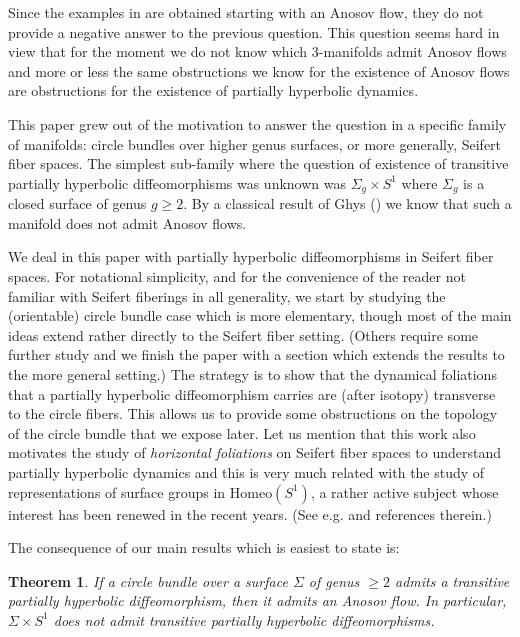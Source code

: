 \documentclass[11pt]{amsart} %
\numberwithin{equation}{section}
\newtheorem*{teo*}{Theorem}
\theoremstyle{remark}
\begin{document}
Since the examples in \cite{BPP,BGP,BGHP} are obtained starting with an Anosov flow, they do not provide a negative answer to the previous question. This question seems hard in view that for the moment we do not know which 3-manifolds admit Anosov flows and more or less the same obstructions we know for the existence of Anosov flows are obstructions for the existence of partially hyperbolic dynamics. 

This paper grew out of the motivation to answer the question in a specific family of manifolds: circle bundles over higher genus surfaces, or more generally, Seifert fiber spaces. The simplest sub-family where the question of existence of transitive partially hyperbolic diffeomorphisms was unknown was $\Sigma_g \times S^1$ where $\Sigma_g$ is a closed surface of genus $g \geq 2$. By a classical result of Ghys (\cite{Ghys}) we know that such a manifold does not admit Anosov flows. %

We deal in this paper with partially hyperbolic diffeomorphisms in Seifert fiber spaces. For notational  simplicity, and for the convenience of the reader not familiar with Seifert fiberings in all generality, we start by studying the (orientable) circle bundle case which is more elementary, though most of the main ideas extend rather directly to the Seifert fiber setting. (Others require some further study and we finish the paper with a section which extends the results to the more general setting.) The strategy is to show that the dynamical foliations that a partially hyperbolic diffeomorphism carries are (after isotopy) transverse to the circle fibers. This allows us to provide some obstructions on the topology of the circle bundle that we expose later. Let us mention that this work also motivates the study of \emph{horizontal foliations} on Seifert fiber spaces to understand partially hyperbolic dynamics and this is very much related with the study of representations of surface groups in $\mathrm{Homeo}
(
S^1)$, a rather active subject whose interest has been renewed in the recent years. (See e.g. \cite{Bowden,Mann} and references therein.) 

The consequence of our main results which is easiest to state is: 

\begin{teo*}
If a circle bundle over a surface $\Sigma$ of genus $\geq 2$ admits a transitive partially hyperbolic diffeomorphism, then it admits an Anosov flow. In particular, $\Sigma \times S^1$ does not admit transitive partially hyperbolic diffeomorphisms. 
\end{teo*}  
\end{document}
